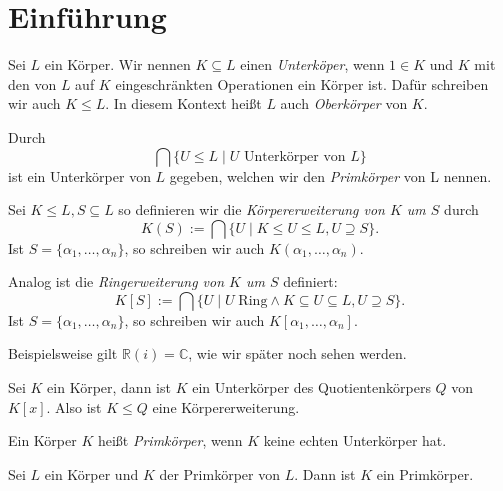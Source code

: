 \section{Einführung}

\begin{definition}\label{def:unterkoerper}
    Sei $L$ ein Körper. Wir nennen $K \subseteq L$ einen \emph{Unterköper}, wenn $1 \in K$ und $K$ mit den von $L$ auf $K$ eingeschränkten Operationen ein Körper ist. Dafür schreiben wir auch $K \leq L$. In diesem Kontext heißt $L$ auch \emph{Oberkörper} von $K$.

    Durch
    $$ \bigcap \{ U \leq L \mid U \text{ Unterkörper von } L \} $$
    ist ein Unterkörper von $L$ gegeben, welchen wir den \emph{Primkörper} von L nennen.

    Sei $K \leq L, S \subseteq L$ so definieren wir die \emph{Körpererweiterung von $K$ um $S$} durch
    $$ K(S) := \bigcap \{ U \mid K \leq U \leq L, U \supseteq S \}. $$
    Ist $S = \{ \alpha_1, \hdots, \alpha_n \}$, so schreiben wir auch $K(\alpha_1, \hdots, \alpha_n)$.
    
    Analog ist die \emph{Ringerweiterung von $K$ um $S$} definiert:
    $$ K[S] := \bigcap \{ U \mid U \;\mathrm{Ring}\land K \subseteq U \subseteq L, U \supseteq S \}. $$
    Ist $S = \{ \alpha_1, \hdots, \alpha_n \}$, so schreiben wir auch $K[\alpha_1, \hdots, \alpha_n]$.
\end{definition}

\begin{remark}
    Beispielsweise gilt $\mathbb{R}(i) = \mathbb{C}$, wie wir später noch sehen werden.
\end{remark}

\begin{remark}
    Sei $K$ ein Körper, dann ist $K$ ein Unterkörper des Quotientenkörpers $Q$ von $K[x]$. Also ist $K \leq Q$ eine Körpererweiterung.
\end{remark}

\begin{definition}
    Ein Körper $K$ heißt \emph{Primkörper}, wenn $K$ keine echten Unterkörper hat.
\end{definition}

\begin{remark}
    Sei $L$ ein Körper und $K$ der Primkörper von $L$. Dann ist $K$ ein Primkörper.
\end{remark}

